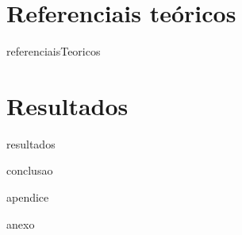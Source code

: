 \documentclass[
	12pt,				%
	openright,			%
	twoside,			%
	a4paper,			%
	english,			%
	french,				%
	spanish,			%
	brazil				%
	]{abntex2}
\begin{document}
\part{Referenciais teóricos}
{referenciaisTeoricos}

\part{Resultados}
{resultados}


{conclusao}

\postextual



{apendice}

{anexo}

\printindex
\end{document}
